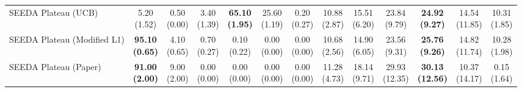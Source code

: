 \begin{table}[H]
{\begin{tabular}{l|cccccc|cccccc}
SEEDA Plateau (UCB) & \makecell{5.20 \\ (1.52)} & \makecell{0.50 \\ (0.00)} & {\cellcolor[HTML]{C8E6C9}} \makecell{3.40 \\ (1.39)} & \bfseries \makecell{65.10 \\ (1.95)} & \makecell{25.60 \\ (1.19)} & \makecell{0.20 \\ (0.27)} & \makecell{10.88 \\ (2.87)} & \makecell{15.51 \\ (6.20)} & {\cellcolor[HTML]{C8E6C9}} \makecell{23.84 \\ (9.79)} & \bfseries \makecell{24.92 \\ (9.27)} & \makecell{14.54 \\ (11.85)} & \makecell{10.31 \\ (1.85)} \\
SEEDA Plateau (Modified L1) & \bfseries \makecell{95.10 \\ (0.65)} & \makecell{4.10 \\ (0.65)} & {\cellcolor[HTML]{C8E6C9}} \makecell{0.70 \\ (0.27)} & \makecell{0.10 \\ (0.22)} & \makecell{0.00 \\ (0.00)} & \makecell{0.00 \\ (0.00)} & \makecell{10.68 \\ (2.56)} & \makecell{14.90 \\ (6.05)} & {\cellcolor[HTML]{C8E6C9}} \makecell{23.56 \\ (9.31)} & \bfseries \makecell{25.76 \\ (9.26)} & \makecell{14.82 \\ (11.74)} & \makecell{10.28 \\ (1.98)} \\
SEEDA Plateau (Paper) & \bfseries \makecell{91.00 \\ (2.00)} & \makecell{9.00 \\ (2.00)} & {\cellcolor[HTML]{C8E6C9}} \makecell{0.00 \\ (0.00)} & \makecell{0.00 \\ (0.00)} & \makecell{0.00 \\ (0.00)} & \makecell{0.00 \\ (0.00)} & \makecell{11.28 \\ (4.73)} & \makecell{18.14 \\ (9.71)} & {\cellcolor[HTML]{C8E6C9}} \makecell{29.93 \\ (12.35)} & \bfseries \makecell{30.13 \\ (12.56)} & \makecell{10.37 \\ (14.17)} & \makecell{0.15 \\ (1.64)} \\
\bottomrule
\end{tabular}
}%
\end{table}
